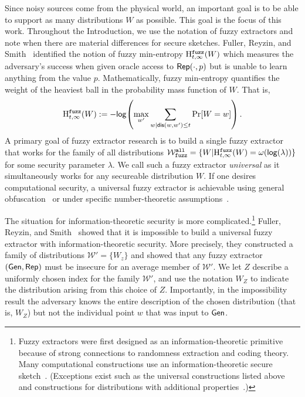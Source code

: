   
Since noisy sources come from the physical world, an important goal
  is to be able to support as many distributions $W$ as possible. This goal is the focus of this work. 
  Throughout the Introduction, we use the notation of fuzzy extractors
  and note when there are material differences for secure sketches.
  Fuller, Reyzin, and Smith~\cite{fuller2016fuzzy,fuller2020fuzzy}
  identified the notion of fuzzy min-entropy $\mathrm{H}^{\mathtt{fuzz}}_{t,\infty}(W)$ which
  measures the adversary's success when given oracle access to
  ${\mathsf{Rep}}(\cdot, p)$ but is unable to learn anything from the value $p$.
  Mathematically, fuzzy min-entropy quantifies the weight of the heaviest ball
  in the probability mass function of $W$.  That is,
\[
\mathrm{H}^{\mathtt{fuzz}}_{t,\infty}(W):= -\mathsf{log}\!\left(\max_{w'} \sum_{w | \mathsf{dis}(w, w')\le t} \Pr[W=w]\right).
\]A primary goal of fuzzy extractor research is to build a single fuzzy extractor that works for the family of all distributions $\mathcal{W}_{\mathtt{fuzz}}^{\mathtt{all}} = \{ W | \mathrm{H}^{\mathtt{fuzz}}_{t,\infty}(W) = \omega(\mathsf{log}\!\left(\lambda\right))\}$ for some security parameter $\lambda$.  We call such a fuzzy extractor \emph{universal} as it simultaneously works for any secureable distribution $W$. 
If one desires computational security, a universal fuzzy extractor is achievable using general obfuscation~\cite{BarakBCKPS13,BitanskyCKP14,bitansky2017virtual} or under specific number-theoretic assumptions~\cite{galbraith2019obfuscated}. 


The situation for information-theoretic security is more
complicated.\footnote{Fuzzy extractors were first designed as an
  information-theoretic primitive because of strong connections to
  randomness extraction and coding theory.  Many computational
  constructions use an information-theoretic secure
  sketch~\cite{wen2018robustly,wen2019generic}.  (Exceptions exist
  such as the universal constructions listed above and constructions
  for distributions with additional
  properties~\cite{apon2017efficient,alamelou2018pseudoentropic,fuller2020computational,canetti2021reusable}.)
}  Fuller, Reyzin, and Smith~\cite{fuller2020fuzzy} showed that it is
impossible to build a universal fuzzy extractor with
information-theoretic security.  More precisely, they constructed a
family of distributions $\mathcal{W}' = \{ W_z \}$ and showed that any
fuzzy extractor $({\mathsf{Gen}}, {\mathsf{Rep}})$ must be insecure for an average member
of $\mathcal{W}'$. We let $Z$ describe a uniformly chosen index for
the family $\mathcal{W'}$, and use the notation $W_Z$ to indicate the
distribution arising from this choice of $Z$. Importantly, in the
impossibility result the adversary knows the entire description of the
chosen distribution (that is, $W_Z$) but not the
individual point $w$ that was input to ${\mathsf{Gen}}$.

